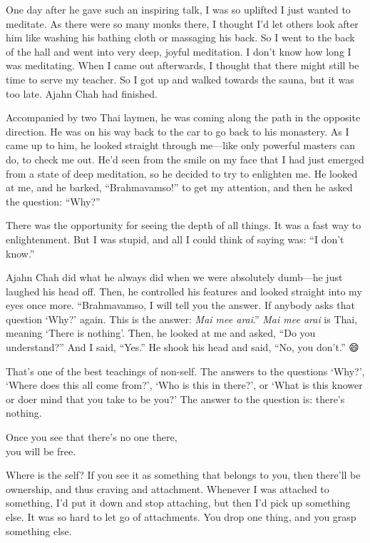 \documentclass[12pt, openany]{book}
\newenvironment{aphorism}%
{%
\begin{center}\begin{itshape}
}%
{\end{itshape}\end{center}
}%
\begin{document}
One day after he gave such an inspiring talk, I was so uplifted I just wanted to meditate. As there were so many monks there, I thought I’d let others look after him like washing his bathing cloth or massaging his back. So I went to the back of the hall and went into very deep, joyful meditation. I don’t know how long I was meditating. When I came out afterwards, I thought that there might still be time to serve my teacher. So I got up and walked towards the sauna, but it was too late. Ajahn Chah had finished. 

Accompanied by two Thai laymen, he was coming along the path in the opposite direction. He was on his way back to the car to go back to his monastery. As I came up to him, he looked straight through me—like only powerful masters can do, to check me out. He’d seen from the smile on my face that I had just emerged from a state of deep meditation, so he decided to try to enlighten me. He looked at me, and he barked, “Brahmavamso!” to get my attention, and then he asked the question: “Why?” 

There was the opportunity for seeing the depth of all things. It was a fast way to enlightenment. But I was stupid, and all I could think of saying was: “I don’t know.” 

Ajahn Chah did what he always did when we were absolutely dumb—he just laughed his head off. Then, he controlled his features and looked straight into my eyes once more. “Brahmavamso, I will tell you the answer. If anybody asks that question ‘Why?’ again. This is the answer: \emph{Mai mee arai}.” \emph{Mai mee arai} is Thai, meaning ‘There is nothing’. Then, he looked at me and asked, “Do you understand?” And I said, “Yes.” He shook his head and said, “No, you don’t.” 😄 

That’s one of the best teachings of non-self. The answers to the questions ‘Why?’, ‘Where does this all come from?’, ‘Who is this in there?’, or ‘What is this knower or doer mind that you take to be you?’ The answer to the question is: there’s nothing. 

\begin{aphorism}
Once you see that there’s no one there,\\  
you will be free.
\end{aphorism}

Where is the self? If you see it as something that belongs to you, then there’ll be ownership, and thus craving and attachment. Whenever I was attached to something, I’d put it down and stop attaching, but then I’d pick up something else. It was so hard to let go of attachments. You drop one thing, and you grasp something else. 
\end{document}
